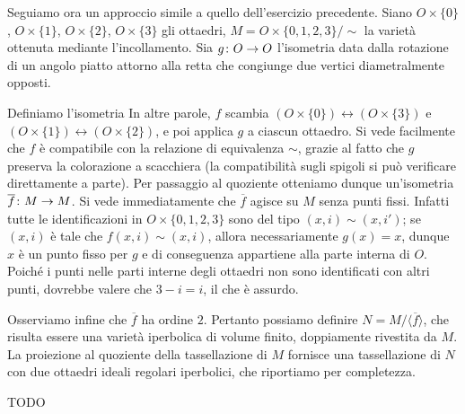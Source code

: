 Seguiamo ora un approccio simile a quello dell'esercizio precedente. Siano $O\times\{0\}$, $O\times\{1\}$, $O\times\{2\}$, $O\times\{3\}$ gli ottaedri, $M=O\times\{0,1,2,3\}/\sim$ la varietà ottenuta mediante l'incollamento. Sia $\map{g}{O}{O}$ l'isometria data dalla rotazione di un angolo piatto attorno alla retta che congiunge due vertici diametralmente opposti.
\begin{center}
\end{center}
Definiamo l'isometria
In altre parole, $f$ scambia $(O\times\{0\})\leftrightarrow (O\times\{3\})$ e $(O\times\{1\})\leftrightarrow (O\times\{2\})$, e poi applica $g$ a ciascun ottaedro. Si vede facilmente che $f$ è compatibile con la relazione di equivalenza $\sim$, grazie al fatto che $g$ preserva la colorazione a scacchiera (la compatibilità sugli spigoli si può verificare direttamente a parte). Per passaggio al quoziente otteniamo dunque un'isometria $\map{\overline{f}}{M}{M}$. Si vede immediatamente che $\overline{f}$ agisce su $M$ senza punti fissi. Infatti tutte le identificazioni in $O\times\{0,1,2,3\}$ sono del tipo $(x,i)\sim(x,i')$; se $(x,i)$ è tale che $f(x,i)\sim (x,i)$, allora necessariamente $g(x)=x$, dunque $x$  è un punto fisso per $g$ e di conseguenza appartiene alla parte interna di $O$. Poiché i punti nelle parti interne degli ottaedri non sono identificati con altri punti, dovrebbe valere che $3-i=i$, il che è assurdo.

Osserviamo infine che $\overline{f}$ ha ordine $2$. Pertanto possiamo definire $N=M/\langle\overline{f}\rangle$, che risulta essere una varietà iperbolica di volume finito, doppiamente rivestita da $M$. La proiezione al quoziente della tassellazione di $M$ fornisce una tassellazione di $N$ con due ottaedri ideali regolari iperbolici, che riportiamo per completezza.

\huge{TODO}
